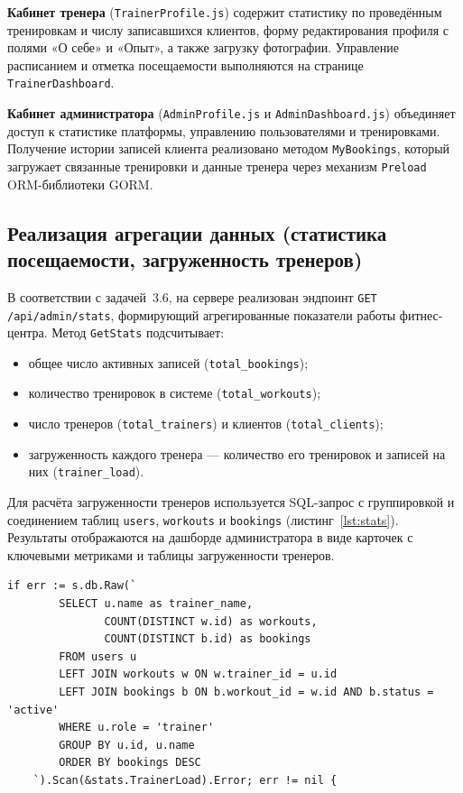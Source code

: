 \textbf{Кабинет тренера} (\texttt{TrainerProfile.js}) содержит статистику
по проведённым тренировкам и числу записавшихся клиентов, форму редактирования
профиля с полями «О себе» и «Опыт», а также загрузку фотографии. Управление
расписанием и отметка посещаемости выполняются на странице
\texttt{TrainerDashboard}.

\textbf{Кабинет администратора} (\texttt{AdminProfile.js} и
\texttt{AdminDashboard.js}) объединяет доступ к статистике платформы,
управлению пользователями и тренировками. Получение истории записей клиента
реализовано методом \texttt{MyBookings}, который загружает связанные
тренировки и данные тренера через механизм \texttt{Preload} ORM-библиотеки GORM.

\subsection{Реализация агрегации данных (статистика посещаемости, загруженность тренеров)}

В соответствии с задачей~3.6, на сервере реализован эндпоинт
\texttt{GET /api/admin/stats}, формирующий агрегированные показатели
работы фитнес-центра. Метод \texttt{GetStats} подсчитывает:
\begin{itemize}
  \item общее число активных записей (\texttt{total\_bookings});
  \item количество тренировок в системе (\texttt{total\_workouts});
  \item число тренеров (\texttt{total\_trainers}) и клиентов (\texttt{total\_clients});
  \item загруженность каждого тренера --- количество его тренировок и записей
        на них (\texttt{trainer\_load}).
\end{itemize}

Для расчёта загруженности тренеров используется SQL-запрос с группировкой
и соединением таблиц \texttt{users}, \texttt{workouts} и \texttt{bookings}
(листинг~\ref{lst:stats}). Результаты отображаются на дашборде администратора
в виде карточек с ключевыми метриками и таблицы загруженности тренеров.

\begin{lstlisting}[caption={SQL-запрос загруженности тренеров (adminService.go, стр.~159--169)}, label={lst:stats}]
	if err := s.db.Raw(`
		SELECT u.name as trainer_name,
		       COUNT(DISTINCT w.id) as workouts,
		       COUNT(DISTINCT b.id) as bookings
		FROM users u
		LEFT JOIN workouts w ON w.trainer_id = u.id
		LEFT JOIN bookings b ON b.workout_id = w.id AND b.status = 'active'
		WHERE u.role = 'trainer'
		GROUP BY u.id, u.name
		ORDER BY bookings DESC
	`).Scan(&stats.TrainerLoad).Error; err != nil {
\end{lstlisting}

